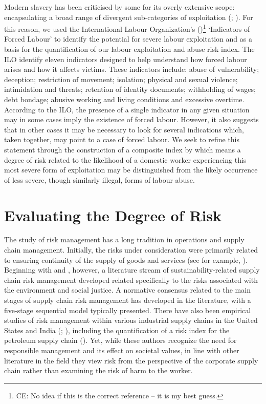 \documentclass[
  12pt,
  letterpaper,
  DIV=11,
  numbers=noendperiod]{scrartcl}
\theoremstyle{plain}
\theoremstyle{definition}
\begin{document}
Modern slavery has been criticised by some for its overly extensive
scope: encapsulating a broad range of divergent sub-categories of
exploitation (\textcite{oconnell_davidson_margins_2015};
\textcite{gutierrez-huerter_o_change_2023}). For this reason, we used
the International Labour Organization's
(\textcite{ILO11-indicators})\footnote{CE: No idea if this is the
  correct reference -- it is my best guess.} `Indicators of Forced
Labour' to identify the potential for severe labour exploitation and as
a basis for the quantification of our labour exploitation and abuse risk
index. The ILO identify eleven indicators designed to help understand
how forced labour arises and how it affects victims. These indicators
include: abuse of vulnerability; deception; restriction of movement;
isolation; physical and sexual violence; intimidation and threats;
retention of identity documents; withholding of wages; debt bondage;
abusive working and living conditions and excessive overtime. According
to the ILO, the presence of a single indicator in any given situation
may in some cases imply the existence of forced labour. However, it also
suggests that in other cases it may be necessary to look for several
indications which, taken together, may point to a case of forced labour.
We seek to refine this statement through the construction of a composite
index by which means a degree of risk related to the likelihood of a
domestic worker experiencing this most severe form of exploitation may
be distinguished from the likely occurrence of less severe, though
similarly illegal, forms of labour abuse.

\section{Evaluating the Degree of
Risk}\label{evaluating-the-degree-of-risk}

The study of risk management has a long tradition in operations and
supply chain management. Initially, the risks under consideration were
primarily related to ensuring continuity of the supply of goods and
services (see for example, \textcite{juttner_supply_2003}). Beginning
with \textcite{anderson_critical_2006} and
\textcite{anderson_sustainability_2009}, however, a literature stream of
sustainability-related supply chain risk management developed related
specifically to the risks associated with the environment and social
justice. A normative consensus related to the main stages of supply
chain risk management has developed in the literature, with a five-stage
sequential model typically presented. There have also been empirical
studies of risk management within various industrial supply chains in
the United States and India (\textcite{tarei_hybrid_2018};
\textcite{dellana_scale_2021}), including the quantification of a risk
index for the petroleum supply chain (\textcite{tarei_hybrid_2018}).
Yet, while these authors recognize the need for responsible management
and its effect on societal values, in line with other literature in the
field they view risk from the perspective of the corporate supply chain
rather than examining the risk of harm to the worker.
\end{document}
